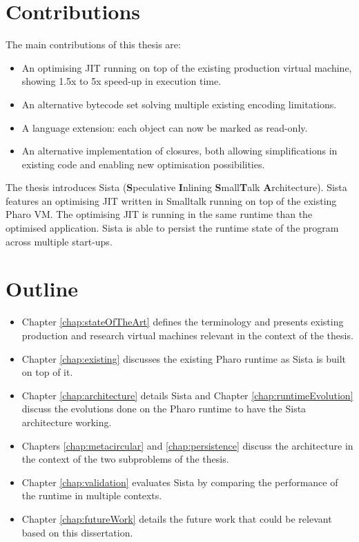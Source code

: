 \documentclass[a4paper,12pt,twoside]{../includes/ThesisStyle}
\begin{document}
\section{Contributions}

The main contributions of this thesis are:
\begin{itemize}
	\item An optimising JIT running on top of the existing production virtual machine, showing 1.5x to 5x speed-up in execution time.
	\item An alternative bytecode set solving multiple existing encoding limitations.
	\item A language extension: each object can now be marked as read-only.
	\item An alternative implementation of closures, both allowing simplifications in existing code and enabling new optimisation possibilities.
\end{itemize}

The thesis introduces Sista (\textbf{S}peculative \textbf{I}nlining \textbf{S}mall\textbf{T}alk \textbf{A}rchitecture). Sista features an optimising JIT written in Smalltalk running on top of the existing Pharo VM. The optimising JIT is running in the same runtime than the optimised application. Sista is able to persist the runtime state of the program across multiple start-ups. %

\section{Outline}

\begin{itemize}
	\item Chapter \ref{chap:stateOfTheArt} defines the terminology and presents existing production and research virtual machines relevant in the context of the thesis. 
	\item Chapter \ref{chap:existing} discusses the existing Pharo runtime as Sista is built on top of it.
	\item Chapter \ref{chap:architecture} details Sista and Chapter \ref{chap:runtimeEvolution} discuss the evolutions done on the Pharo runtime to have the Sista architecture working.
	\item Chapters \ref{chap:metacircular} and \ref{chap:persistence} 
	discuss the architecture in the context of the two subproblems of the thesis. 
	\item Chapter \ref{chap:validation} evaluates Sista by comparing the performance of the runtime in multiple contexts.
	\item Chapter \ref{chap:futureWork} details the future work that could be relevant based on this dissertation.
\end{itemize}



\ifx\wholebook\relax\else
    
\end{document}
